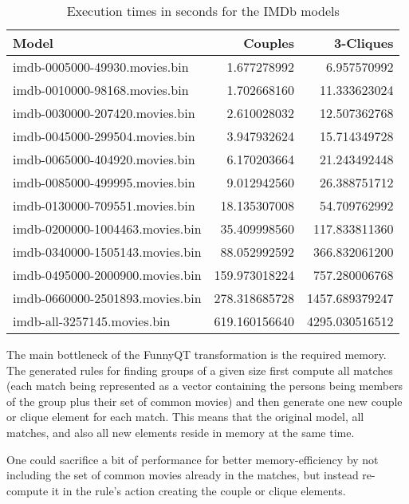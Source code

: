 \documentclass[submission]{eptcs}
\begin{document}
\begin{table}
  \centering
  \begin{tabular}{| l | r | r |}
    \hline
    \textbf{Model}                  & \textbf{Couples} & \textbf{3-Cliques}\\
    \hline
    imdb-0005000-49930.movies.bin   &   1.677278992    &        6.957570992\\
    imdb-0010000-98168.movies.bin   &   1.702668160    &        11.333623024\\
    imdb-0030000-207420.movies.bin  &   2.610028032    &        12.507362768\\
    imdb-0045000-299504.movies.bin  &   3.947932624    &        15.714349728\\
    imdb-0065000-404920.movies.bin  &   6.170203664    &        21.243492448\\
    imdb-0085000-499995.movies.bin  &   9.012942560    &        26.388751712\\
    imdb-0130000-709551.movies.bin  &   18.135307008   &        54.709762992\\
    imdb-0200000-1004463.movies.bin &   35.409998560   &        117.833811360\\
    imdb-0340000-1505143.movies.bin &   88.052992592   &        366.832061200\\
    imdb-0495000-2000900.movies.bin &   159.973018224  &        757.280006768\\
    imdb-0660000-2501893.movies.bin &   278.318685728  &        1457.689379247\\
    imdb-all-3257145.movies.bin     &   619.160156640  &        4295.030516512\\
    \hline
  \end{tabular}
  \caption{Execution times in seconds for the IMDb models}
  \label{tab:bench-imdb}
\end{table}

The main bottleneck of the FunnyQT transformation is the required memory.  The
generated rules for finding groups of a given size first compute all matches
(each match being represented as a vector containing the persons being members
of the group plus their set of common movies) and then generate one new couple
or clique element for each match.  This means that the original model, all
matches, and also all new elements reside in memory at the same time.

One could sacrifice a bit of performance for better memory-efficiency by not
including the set of common movies already in the matches, but instead
re-compute it in the rule's action creating the couple or clique elements.
\end{document}
